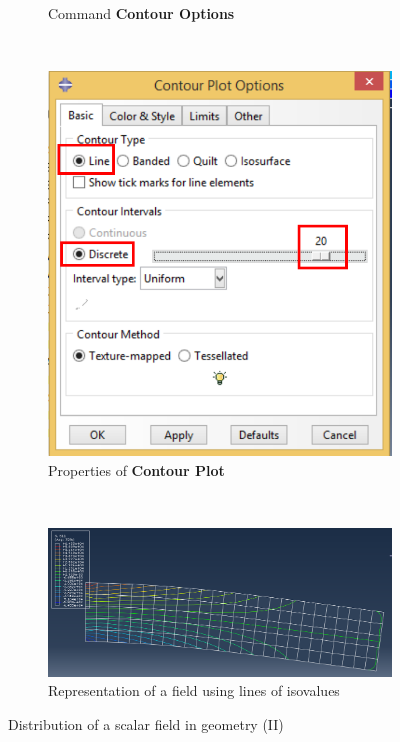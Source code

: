 \begin{enumerate}
\begin{figure}[H]
\begin{subfigure}{0.19\textwidth}
      \caption{Command \textbf{Contour Options}}
      \label{figu79}
    \end{subfigure}%
    ~ %
    \begin{subfigure}{0.35\textwidth}
      \includegraphics[width=\textwidth]{./body/images/imagen80.pdf}
      \caption{Properties of \textbf{Contour Plot}}
      \label{figu80}
    \end{subfigure}%
    ~ %
    \begin{subfigure}{0.44\textwidth}
      \includegraphics[width=\textwidth]{./body/images/imagen81}
      \caption{Representation of a field using lines of isovalues}
      \label{figu81}
    \end{subfigure}%
    \caption{Distribution of a scalar field in geometry (II)}
  \end{figure}


\end{enumerate}
